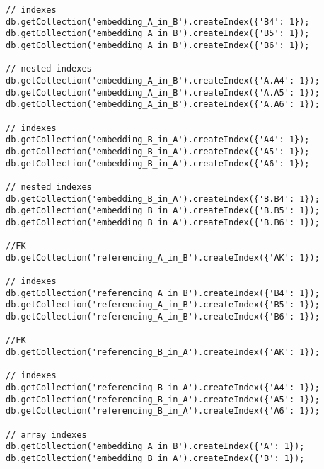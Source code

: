 \begin{lstlisting}[caption=making indexes, style=customJs]
// indexes
db.getCollection('embedding_A_in_B').createIndex({'B4': 1});
db.getCollection('embedding_A_in_B').createIndex({'B5': 1});
db.getCollection('embedding_A_in_B').createIndex({'B6': 1});

// nested indexes
db.getCollection('embedding_A_in_B').createIndex({'A.A4': 1});
db.getCollection('embedding_A_in_B').createIndex({'A.A5': 1});
db.getCollection('embedding_A_in_B').createIndex({'A.A6': 1});

// indexes
db.getCollection('embedding_B_in_A').createIndex({'A4': 1});
db.getCollection('embedding_B_in_A').createIndex({'A5': 1});
db.getCollection('embedding_B_in_A').createIndex({'A6': 1});

// nested indexes
db.getCollection('embedding_B_in_A').createIndex({'B.B4': 1});
db.getCollection('embedding_B_in_A').createIndex({'B.B5': 1});
db.getCollection('embedding_B_in_A').createIndex({'B.B6': 1});

//FK
db.getCollection('referencing_A_in_B').createIndex({'AK': 1});               

// indexes
db.getCollection('referencing_A_in_B').createIndex({'B4': 1});
db.getCollection('referencing_A_in_B').createIndex({'B5': 1});
db.getCollection('referencing_A_in_B').createIndex({'B6': 1});

//FK
db.getCollection('referencing_B_in_A').createIndex({'AK': 1});               

// indexes
db.getCollection('referencing_B_in_A').createIndex({'A4': 1});
db.getCollection('referencing_B_in_A').createIndex({'A5': 1});
db.getCollection('referencing_B_in_A').createIndex({'A6': 1});

// array indexes
db.getCollection('embedding_A_in_B').createIndex({'A': 1});
db.getCollection('embedding_B_in_A').createIndex({'B': 1});
\end{lstlisting}

% 
